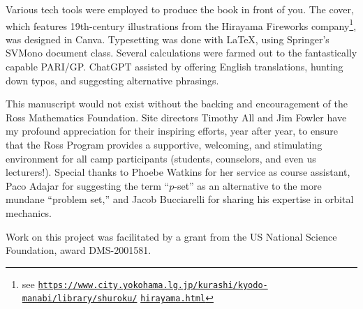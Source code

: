 Various tech tools were employed to produce the book in front of you. The cover, which features 19th-century illustrations from the Hirayama Fireworks company\footnote{
see \href{https://www.city.yokohama.lg.jp/kurashi/kyodo-manabi/library/shuroku/hirayama.html}{\nolinkurl{https://www.city.yokohama.lg.jp/kurashi/kyodo-manabi/library/shuroku/}} \href{https://www.city.yokohama.lg.jp/kurashi/kyodo-manabi/library/shuroku/hirayama.html}{\nolinkurl{hirayama.html}}
}, was designed in Canva. Typesetting was done with \LaTeX, using Springer's SVMono document class. Several calculations were farmed out to the fantastically capable PARI/GP. ChatGPT assisted by offering English translations, hunting down typos, and suggesting alternative phrasings. 

This manuscript would not exist without the backing and encouragement of the Ross Mathematics Foundation. Site directors Timothy All and Jim Fowler have my profound appreciation for their inspiring efforts, year after year, to ensure that the Ross Program provides a supportive, welcoming, and stimulating environment for all camp participants (students, counselors, and even us lecturers!). Special thanks to Phoebe Watkins for her service as course assistant, Paco Adajar for suggesting the term ``$p$-set'' as an alternative to the more mundane ``problem set,'' and Jacob Bucciarelli for sharing his expertise in orbital mechanics.

Work on this project was facilitated by a grant from the US National Science Foundation, award DMS-2001581. 

